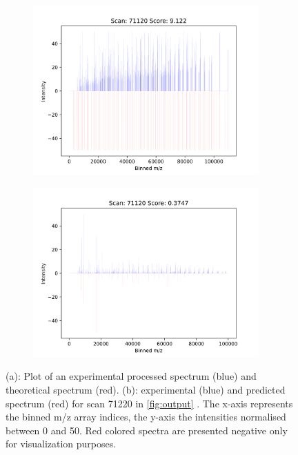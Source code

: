 \documentclass[11pt]{article}
\begin{document}
\begin{figure}
\centering
\begin{subfigure}[b]{1\textwidth}
    \includegraphics[width=0.95\textwidth]{figs/scan_71120_ps=False.png}
   \caption{}
   \label{fig:theo} 
\end{subfigure}
\begin{subfigure}[b]{1\textwidth}
   \includegraphics[width=0.95\textwidth]{figs/scan_71120_ps=True.png}
   \caption{}
   \label{fig:predict}
\end{subfigure}

\caption{(a): Plot of an experimental processed spectrum (blue) and theoretical spectrum (red). (b): experimental (blue) and predicted spectrum (red) for scan 71220 in \cref{fig:output} . The x-axis represents the binned m/z array indices, the y-axis the intensities normalised between 0 and 50. Red colored spectra are presented negative only for visualization purposes.}
\label{predandtheo}
\end{figure}
\end{document}
